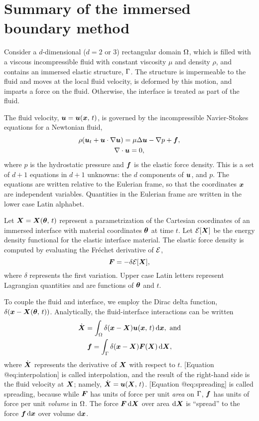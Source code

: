 \section{Summary of the immersed boundary method}

Consider a $d$-dimensional ($d=2$ or 3) rectangular domain $\Omega$, which is
filled with a viscous incompressible fluid with constant viscosity $\mu$ and
density $\rho$, and contains an immersed elastic structure, $\Gamma$. The
structure is impermeable to the fluid and moves at the local fluid velocity, is
deformed by this motion, and imparts a force on the fluid. Otherwise, the
interface is treated as part of the fluid. 

The fluid velocity, $\boldsymbol{u} = \boldsymbol{u}(\boldsymbol{x},\,t)$, is governed by the
incompressible Navier-Stokes equations for a Newtonian fluid,
\begin{gather}
    \label{eq:ins-momentum}
    \rho(\u_t + \u\cdot\grad\u) = \mu\Delta\u - \grad p + \f, \\
    \label{eq:ins-incompressibility}
    \div\u = 0,
\end{gather}
where $p$ is the hydrostatic pressure and $\boldsymbol{f}$ is the elastic force
density. This is a set of $d+1$ equations in $d+1$ unknowns: the $d$ components
of $\boldsymbol{u}$, and $p$. The equations are written relative to the Eulerian
frame, so that the coordinates $\boldsymbol{x}$ are independent variables. Quantities
in the Eulerian frame are written in the lower case Latin alphabet.

Let $\boldsymbol{X}=\boldsymbol{X}(\boldsymbol{\theta},\,t)$ represent a parametrization of the
Cartesian coordinates of an immersed interface with material coordinates
$\boldsymbol{\theta}$ at time $t$. Let $\mathcal{E}[\boldsymbol{X}]$ be the energy density
functional for the elastic interface material. The elastic force density is
computed by evaluating the Fréchet derivative of $\mathcal{E}$,
\begin{equation}
    \boldsymbol{F} = -\delta \mathcal{E}[\boldsymbol{X}],
\end{equation}
where $\delta$ represents the first variation. Upper case Latin letters
represent Lagrangian quantities and are functions of $\boldsymbol{\theta}$ and $t$.

To couple the fluid and interface, we employ the Dirac delta function,
$\delta(\boldsymbol{x}-\boldsymbol{X}(\boldsymbol{\theta},\,t))$. Analytically, the fluid-interface
interactions can be written
\begin{gather}
    \label{eq:interpolation}
    \U = \int_\domain \Dirac(\x-\X) \u(\x,\,t)\d\x,\ \text{and} \\
    \label{eq:spreading}
    \f = \int_\interface \Dirac(\x-\X)\F(\X)\d\X,
\end{gather}
where $\dot{\boldsymbol{X}}$ represents the derivative of $\boldsymbol{X}$ with respect to $t$.
[Equation @eq:interpolation] is called interpolation, and the result of the
right-hand side is the fluid velocity at $\boldsymbol{X}$; namely, $\dot{\boldsymbol{X}} = \boldsymbol{u}(\boldsymbol{X},\,t)$.
[Equation @eq:spreading] is called spreading, because while $\boldsymbol{F}$ has units of
force per unit \emph{area} on $\Gamma$, $\boldsymbol{f}$ has units of force per unit
\emph{volume} in $\Omega$. The force $\F\d\X$ over area $\d\X$ is ``spread''
to the force $\f\d\x$ over volume $\d\x$. 

